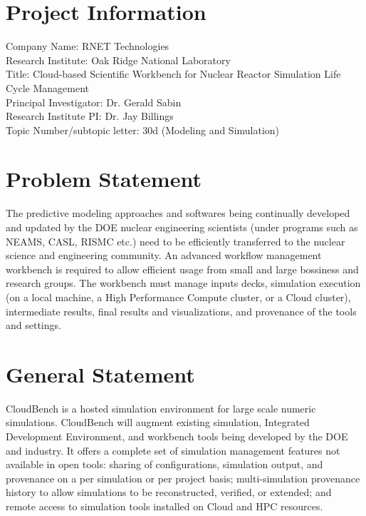 
\section*{Project Information}
Company Name: RNET Technologies\\
Research Institute: Oak Ridge National Laboratory\\
Title: Cloud-based Scientific Workbench for Nuclear Reactor Simulation  Life Cycle Management\\
Principal Investigator: Dr. Gerald Sabin\\
Research Institute PI: Dr. Jay Billings\\
Topic Number/subtopic letter: 30d (Modeling and Simulation)

\section*{Problem Statement}
The predictive modeling approaches and softwares being continually
developed and updated by the DOE nuclear engineering scientists (under
programs such as NEAMS, CASL, RISMC etc.) need to be efficiently
transferred to the nuclear science and engineering community.  An
advanced workflow management workbench is required to allow efficient
usage from small and large bossiness and research groups. The
workbench must manage inputs decks, simulation execution (on a local
machine, a High Performance Compute cluster, or a Cloud cluster),
intermediate results, final results and visualizations, and provenance
of the tools and settings.

\section*{General Statement}
CloudBench is a hosted simulation environment for large scale numeric
simulations.  CloudBench will augment existing simulation, Integrated
Development Environment, and workbench tools being developed by the
DOE and industry. It offers a complete set of simulation management
features not available in open tools: sharing of configurations,
simulation output, and provenance on a per simulation or per project
basis; multi-simulation provenance history to allow simulations to be
reconstructed, verified, or extended; and remote access to simulation
tools installed on Cloud and HPC resources.

